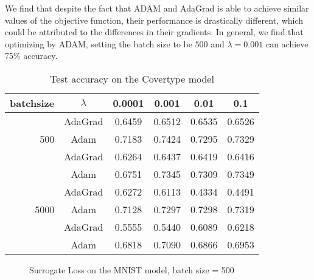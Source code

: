 \documentclass[conference,onecolumn,12pt]{IEEEtran}
\renewcommand{\(}{\left(}
\renewcommand{\)}{\right)}
\numberwithin{equation}{section}
\numberwithin{figure}{section}
\numberwithin{table}{section}
\theoremstyle{definition}
\begin{document}
We find that despite the fact that ADAM and AdaGrad is able to achieve similar values of the objective function, their performance is drastically different, which could be attributed to the differences in their gradients. In general, we find that optimizing by ADAM, setting the batch size to be $500$ and $\lambda=0.001$ can achieve 75\% accuracy. 
  \begin{table}[!htbp]
    \centering
    \begin{tabular}{rccccc}
      \toprule
    batchsize&$\lambda$& 0.0001&0.001&0.01&0.1\\
    \midrule
    \multirow{3}[0]{*}{500} 
    &AdaGrad &0.6459&0.6512&0.6535&0.6526\\
    &Adam&0.7183&0.7424&0.7295&0.7329\\

    \multirow{3}[0]{*}{1000} 
    &AdaGrad &0.6264&0.6437&0.6419&0.6416 \\
    &Adam&0.6751&0.7345&0.7309&0.7349\\
    
    \multirow{3}[0]{*}{5000} 
    &AdaGrad &0.6272&0.6113&0.4334&0.4491\\
    &Adam&0.7128&0.7297&0.7298&0.7319\\
    
    \multirow{3}[0]{*}{10000} 
    &AdaGrad &0.5555&0.5440&0.6089&0.6218\\
    &Adam&0.6818&0.7090&0.6866&0.6953\\
    
    \bottomrule
    \end{tabular}
        \label{tab:acc}
    \caption{Test accuracy on the Covertype model}
    \end{table}
  
    \begin{figure}[!htbp]
      \centering
      \hspace{0.5in}
      \vspace{0.5in}
      \hspace{0.5in}
      \caption{Surrogate Loss on the MNIST model, batch size = 500}
      \end{figure}
      
\end{document}
